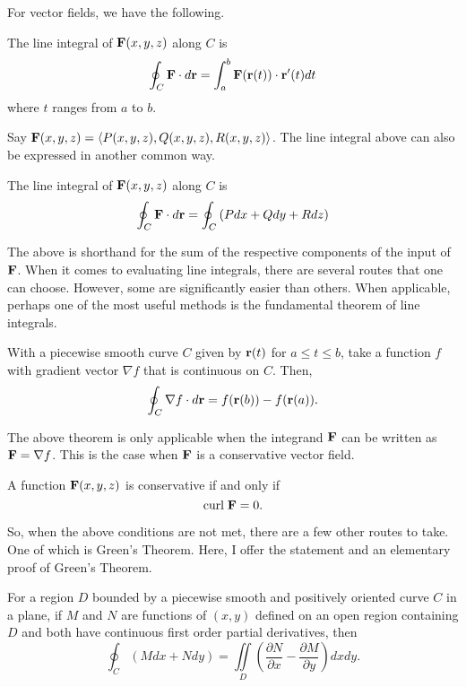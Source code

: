 For vector fields, we have the following.

\begin{definition}
    The line integral of $\mathbf{F}(x, y, z)$ along $C$ is
    \[\oint_{C}\mathbf{F} \cdot d\mathbf{r} = \int_{a}^{b}\mathbf{F}(\mathbf{r}(t)) \cdot \mathbf{r}'(t)dt\]
    where $t$ ranges from $a$ to $b$.
\end{definition}

Say $\mathbf{F}(x, y, z) = \left<P(x, y, z), Q(x, y, z), R(x, y, z)\right>$. The line integral above can also be expressed in another common way.

\begin{corollary}
    The line integral of $\mathbf{F}(x, y, z)$ along $C$ is
    \[\oint_{C}\mathbf{F} \cdot d\mathbf{r} = \oint_{C}\left(Pdx + Qdy + Rdz\right)\]
\end{corollary}

The above is shorthand for the sum of the respective components of the input of $\mathbf{F}$. When it comes to evaluating line integrals, there are several routes that one can choose. However, some are significantly easier than others. When applicable, perhaps one of the most useful methods is the fundamental theorem of line integrals.

\begin{theorem}
    With a piecewise smooth curve $C$ given by $\mathbf{r}(t)$ for $a \leq t \leq b$, take a function $f$ with gradient vector $\nabla f$ that is continuous on $C$. Then,
    \[\oint_{C}\nabla f \cdot d\mathbf{r} = f(\mathbf{r}(b)) - f(\mathbf{r}(a)).\]
\end{theorem}

\begin{remark}
    The above theorem is only applicable when the integrand $\mathbf{F}$ can be written as $\mathbf{F} = \nabla f$. This is the case when $\mathbf{F}$ is a conservative vector field.
\end{remark}

\begin{proposition}
    A function $\mathbf{F}(x, y, z)$ is conservative if and only if
    \[\mathrm{curl}\;\mathbf{F} = 0.\]
\end{proposition}

So, when the above conditions are not met, there are a few other routes to take. One of which is Green's Theorem. Here, I offer the statement and an elementary proof of Green's Theorem.

\begin{theorem}
    For a region $D$ bounded by a piecewise smooth and positively oriented curve $C$ in a plane, if $M$ and $N$ are functions of $(x, y)$ defined on an open region containing $D$ and both have continuous first order partial derivatives, then
    \[\oint_{C}(Mdx + Ndy) = \iint\limits_{D}\left(\frac{\partial N}{\partial x} - \frac{\partial M}{\partial y}\right)dxdy.\]
\end{theorem}

